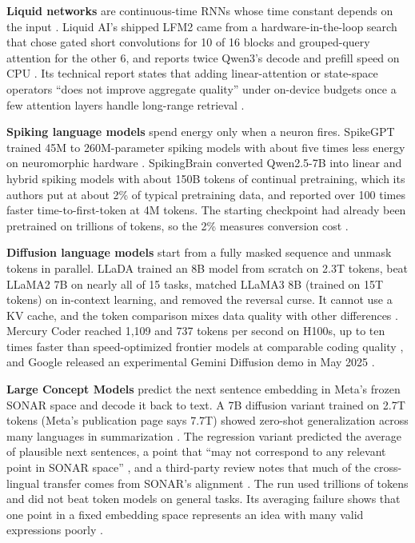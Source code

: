 \textbf{Liquid networks} are continuous-time RNNs whose time constant depends on the input \cite{post96}. Liquid AI's shipped LFM2 came from a hardware-in-the-loop search that chose gated short convolutions for 10 of 16 blocks and grouped-query attention for the other 6, and reports twice Qwen3's decode and prefill speed on CPU \cite{post97,post98}. Its technical report states that adding linear-attention or state-space operators ``does not improve aggregate quality'' under on-device budgets once a few attention layers handle long-range retrieval \cite{post98}.

\textbf{Spiking language models} spend energy only when a neuron fires. SpikeGPT trained 45M to 260M-parameter spiking models with about five times less energy on neuromorphic hardware \cite{post99}. SpikingBrain converted Qwen2.5-7B into linear and hybrid spiking models with about 150B tokens of continual pretraining, which its authors put at about 2\% of typical pretraining data, and reported over 100 times faster time-to-first-token at 4M tokens. The starting checkpoint had already been pretrained on trillions of tokens, so the 2\% measures conversion cost \cite{post100}.

\textbf{Diffusion language models} start from a fully masked sequence and unmask tokens in parallel. LLaDA trained an 8B model from scratch on 2.3T tokens, beat LLaMA2 7B on nearly all of 15 tasks, matched LLaMA3 8B (trained on 15T tokens) on in-context learning, and removed the reversal curse. It cannot use a KV cache, and the token comparison mixes data quality with other differences \cite{post101}. Mercury Coder reached 1,109 and 737 tokens per second on H100s, up to ten times faster than speed-optimized frontier models at comparable coding quality \cite{post102}, and Google released an experimental Gemini Diffusion demo in May 2025 \cite{post105}.

\textbf{Large Concept Models} predict the next sentence embedding in Meta's frozen SONAR space and decode it back to text. A 7B diffusion variant trained on 2.7T tokens (Meta's publication page says 7.7T) showed zero-shot generalization across many languages in summarization \cite{post103}. The regression variant predicted the average of plausible next sentences, a point that ``may not correspond to any relevant point in SONAR space'' \cite{post103}, and a third-party review notes that much of the cross-lingual transfer comes from SONAR's alignment \cite{post104}. The run used trillions of tokens and did not beat token models on general tasks. Its averaging failure shows that one point in a fixed embedding space represents an idea with many valid expressions poorly \cite{post103}.

